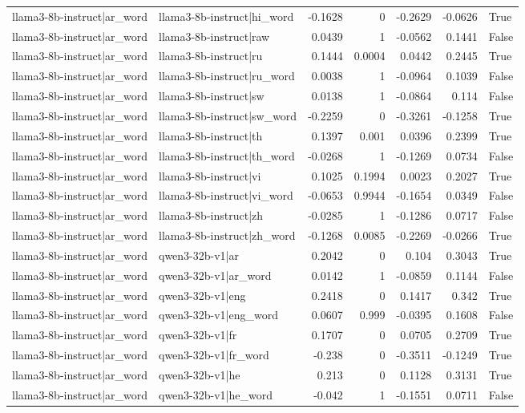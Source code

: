 \begin{table}
\begin{tabular}{l l r r r r l}
llama3-8b-instruct|ar_word & llama3-8b-instruct|hi_word & -0.1628 & 0 & -0.2629 & -0.0626 & True \\
llama3-8b-instruct|ar_word & llama3-8b-instruct|raw & 0.0439 & 1 & -0.0562 & 0.1441 & False \\
llama3-8b-instruct|ar_word & llama3-8b-instruct|ru & 0.1444 & 0.0004 & 0.0442 & 0.2445 & True \\
llama3-8b-instruct|ar_word & llama3-8b-instruct|ru_word & 0.0038 & 1 & -0.0964 & 0.1039 & False \\
llama3-8b-instruct|ar_word & llama3-8b-instruct|sw & 0.0138 & 1 & -0.0864 & 0.114 & False \\
llama3-8b-instruct|ar_word & llama3-8b-instruct|sw_word & -0.2259 & 0 & -0.3261 & -0.1258 & True \\
llama3-8b-instruct|ar_word & llama3-8b-instruct|th & 0.1397 & 0.001 & 0.0396 & 0.2399 & True \\
llama3-8b-instruct|ar_word & llama3-8b-instruct|th_word & -0.0268 & 1 & -0.1269 & 0.0734 & False \\
llama3-8b-instruct|ar_word & llama3-8b-instruct|vi & 0.1025 & 0.1994 & 0.0023 & 0.2027 & True \\
llama3-8b-instruct|ar_word & llama3-8b-instruct|vi_word & -0.0653 & 0.9944 & -0.1654 & 0.0349 & False \\
llama3-8b-instruct|ar_word & llama3-8b-instruct|zh & -0.0285 & 1 & -0.1286 & 0.0717 & False \\
llama3-8b-instruct|ar_word & llama3-8b-instruct|zh_word & -0.1268 & 0.0085 & -0.2269 & -0.0266 & True \\
llama3-8b-instruct|ar_word & qwen3-32b-v1|ar & 0.2042 & 0 & 0.104 & 0.3043 & True \\
llama3-8b-instruct|ar_word & qwen3-32b-v1|ar_word & 0.0142 & 1 & -0.0859 & 0.1144 & False \\
llama3-8b-instruct|ar_word & qwen3-32b-v1|eng & 0.2418 & 0 & 0.1417 & 0.342 & True \\
llama3-8b-instruct|ar_word & qwen3-32b-v1|eng_word & 0.0607 & 0.999 & -0.0395 & 0.1608 & False \\
llama3-8b-instruct|ar_word & qwen3-32b-v1|fr & 0.1707 & 0 & 0.0705 & 0.2709 & True \\
llama3-8b-instruct|ar_word & qwen3-32b-v1|fr_word & -0.238 & 0 & -0.3511 & -0.1249 & True \\
llama3-8b-instruct|ar_word & qwen3-32b-v1|he & 0.213 & 0 & 0.1128 & 0.3131 & True \\
llama3-8b-instruct|ar_word & qwen3-32b-v1|he_word & -0.042 & 1 & -0.1551 & 0.0711 & False \\

\end{tabular}
\end{table}
